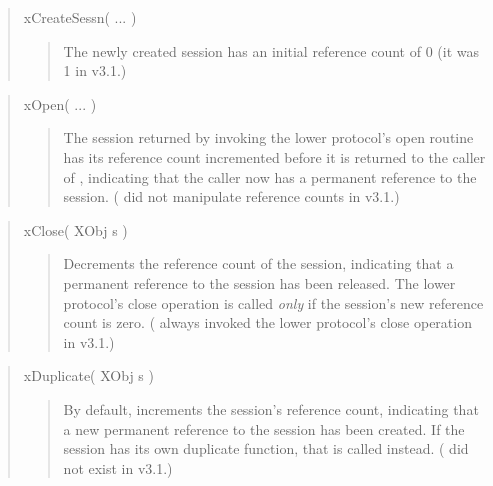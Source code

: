 \begin{quote}
\begin{em}
\noindent xCreateSessn( ... )
\end{em}
\begin{quote}

\noindent The newly created session has an initial reference
count of 0 (it was 1 in v3.1.)

\end{quote}
\end{quote}


\begin{quote}
\begin{em}
\noindent xOpen( ... )
\end{em}
\begin{quote}

\noindent The session returned by invoking the lower protocol's
open routine has its reference count incremented
before it is returned to the caller of \xOpen{}, indicating that the
caller now has a permanent reference to the session.  (\xOpen{}
did not manipulate reference counts in v3.1.)

\end{quote}
\end{quote}

\begin{quote}
\begin{em}
\noindent xClose( XObj s )
\end{em}
\begin{quote}
\noindent Decrements the reference count of the session, indicating
that a permanent reference to the session has been released.  
The lower protocol's close operation is called {\sl only} if
the session's new reference count is zero.  (\xClose{} always
invoked the lower protocol's close operation in v3.1.) 

\end{quote}
\end{quote}

\begin{quote}
\begin{em}
\noindent xDuplicate( XObj s )
\end{em}

\begin{quote}

\noindent By default, increments the session's reference count,
indicating that a new permanent reference to the session has been
created.  If the session has its own duplicate function, that is
called instead.  (\xDuplicate{} did not exist in v3.1.)

\end{quote}
\end{quote}

